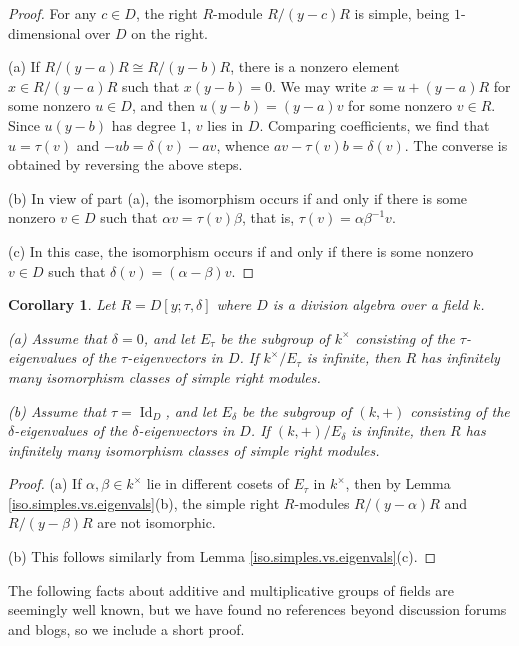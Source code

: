 \documentclass{conm-p-l}
\newtheorem{cor}[theorem]{Corollary}
\theoremstyle{definition}
\theoremstyle{remark}
\numberwithin{equation}{section}
\DeclareMathOperator{\Id}{Id}
\newcommand{\kx}{k^\times}
\begin{document}
\begin{proof}
For any $c\in D$, the right $R$-module $R/(y-c)R$ is simple, being $1$-di\-men\-sional over $D$ on the right.

(a) If $R/(y-a)R \cong R/(y-b)R$, there is a nonzero element $x \in R/(y-a)R$ such that $x(y-b) = 0$.  We may write $x = u+(y-a)R$ for some nonzero $u \in D$, and then $u(y-b) = (y-a)v$ for some nonzero $v \in R$.  Since $u(y-b)$ has degree $1$, $v$ lies in $D$.  Comparing coefficients, we find that $u = \tau(v)$ and $- ub = \delta(v) - av$, whence $av-\tau(v)b = \delta(v)$.  The converse is obtained by reversing the above steps.

(b) In view of part (a), the isomorphism occurs if and only if there is some nonzero $v \in D$ such that $\alpha v = \tau(v) \beta$, that is, $\tau(v) = \alpha \beta^{-1} v$.

(c) In this case, the isomorphism occurs if and only if there is some nonzero $v \in D$ such that $\delta(v) = (\alpha-\beta)v$.
\end{proof}

\begin{cor}  \label{inf.noneigenvals>inf.simples}
Let $R = D[y;\tau,\delta]$ where $D$ is a division algebra over a field $k$.

{\rm(a)} Assume that $\delta = 0$, and let $E_\tau$ be the subgroup of $\kx$ consisting of the $\tau$-eigen\-values of the $\tau$-eigenvectors in $D$.  If $\kx/E_\tau$ is infinite, then $R$ has infinitely many isomorphism classes of simple right modules.

{\rm(b)} Assume that $\tau = \Id_D$, and let $E_\delta$ be the subgroup of $(k,+)$ consisting of the $\delta$-eigen\-values of the $\delta$-eigenvectors in $D$.  If $(k,+)/E_\delta$ is infinite, then $R$ has infinitely many isomorphism classes of simple right modules.
\end{cor}

\begin{proof}
(a) If $\alpha,\beta \in \kx$ lie in different cosets of $E_\tau$ in $\kx$, then by Lemma \ref{iso.simples.vs.eigenvals}(b), the simple right $R$-modules $R/(y-\alpha)R$ and $R/(y-\beta)R$ are not isomorphic.

(b) This follows similarly from Lemma \ref{iso.simples.vs.eigenvals}(c).
\end{proof}

The following facts about additive and multiplicative groups of fields are seemingly well known, but we have found no references beyond discussion forums and blogs, so we include a short proof.
\end{document}
